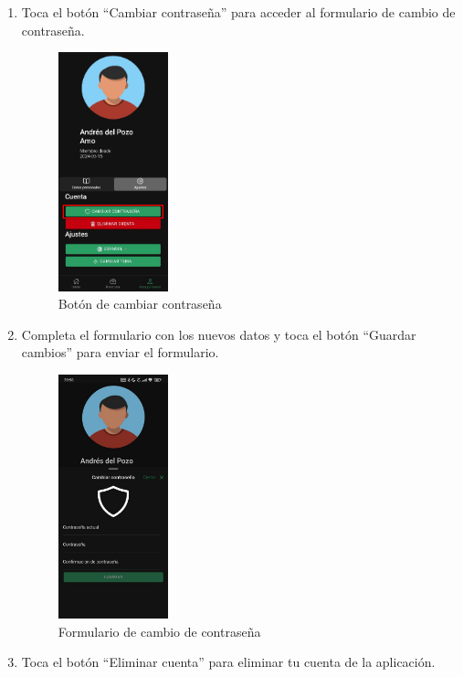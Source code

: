 \begin{enumerate}
	\item Toca el botón “Cambiar contraseña” para acceder al formulario de cambio de contraseña.
	      \begin{figure}[H]
		      \centering
		      \includegraphics[width=0.3\textwidth]{7-Construccion/Manuales/app/P5-Perfil.png}
		      \caption{Botón de cambiar contraseña}
	      \end{figure}
	\item Completa el formulario con los nuevos datos y toca el botón “Guardar cambios” para enviar el formulario.
	      \begin {figure}[H]
	      \centering
	      \includegraphics[width=0.3\textwidth]{7-Construccion/Manuales/app/P6-Perfil.png}
	      \caption{Formulario de cambio de contraseña}
	      \end{figure}
	\item Toca el botón “Eliminar cuenta” para eliminar tu cuenta de la aplicación.

\end{enumerate}
